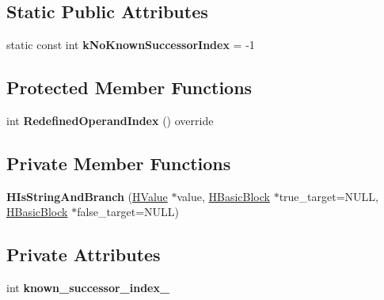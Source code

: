 \subsection*{Static Public Attributes}
\begin{DoxyCompactItemize}
\item 
static const int {\bfseries k\+No\+Known\+Successor\+Index} = -\/1\hypertarget{classv8_1_1internal_1_1_h_is_string_and_branch_ad7d8370139dd6bcddc64977f57c5b019}{}\label{classv8_1_1internal_1_1_h_is_string_and_branch_ad7d8370139dd6bcddc64977f57c5b019}

\end{DoxyCompactItemize}
\subsection*{Protected Member Functions}
\begin{DoxyCompactItemize}
\item 
int {\bfseries Redefined\+Operand\+Index} () override\hypertarget{classv8_1_1internal_1_1_h_is_string_and_branch_a838e74c5c6a22dbf7b4ef73ea540a42f}{}\label{classv8_1_1internal_1_1_h_is_string_and_branch_a838e74c5c6a22dbf7b4ef73ea540a42f}

\end{DoxyCompactItemize}
\subsection*{Private Member Functions}
\begin{DoxyCompactItemize}
\item 
{\bfseries H\+Is\+String\+And\+Branch} (\hyperlink{classv8_1_1internal_1_1_h_value}{H\+Value} $\ast$value, \hyperlink{classv8_1_1internal_1_1_h_basic_block}{H\+Basic\+Block} $\ast$true\+\_\+target=N\+U\+LL, \hyperlink{classv8_1_1internal_1_1_h_basic_block}{H\+Basic\+Block} $\ast$false\+\_\+target=N\+U\+LL)\hypertarget{classv8_1_1internal_1_1_h_is_string_and_branch_af97c5e0075258ea1e898378f535986a0}{}\label{classv8_1_1internal_1_1_h_is_string_and_branch_af97c5e0075258ea1e898378f535986a0}

\end{DoxyCompactItemize}
\subsection*{Private Attributes}
\begin{DoxyCompactItemize}
\item 
int {\bfseries known\+\_\+successor\+\_\+index\+\_\+}\hypertarget{classv8_1_1internal_1_1_h_is_string_and_branch_a4f7dee929017c29579ff5cba18220176}{}\label{classv8_1_1internal_1_1_h_is_string_and_branch_a4f7dee929017c29579ff5cba18220176}

\end{DoxyCompactItemize}
